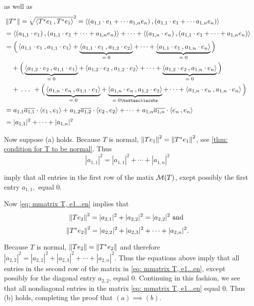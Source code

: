 \begin{prf}
  as well as
  \[
  \begin{aligned}
    & \norm{T^*} = \sqrt{\ip{T^*e_1}{T^*e_1}}^2
    = \ip{(a_{1,1}\cdot e_1 + \cdots a_{1,n} e_n)}{(a_{1,1}\cdot e_1 + \cdots a_{1,n} e_n)} \\
    & = \ip{(a_{1,1}\cdot e_1)}{(a_{1,1}\cdot e_1 + \cdots + a_{1,n} e_n)} + \cdots + \ip{(a_{1,n}\cdot e_n)}{(a_{1,1}\cdot e_1 + \cdots +a_{1,n} e_n)} \\
    & = \Big( \ip{a_{1,1} \cdot e_1}{a_{1,1}\cdot e_1} + \underbrace{\ip{a_{1,1} \cdot e_1}{a_{1,2}\cdot e_2}}_{= \; 0} + \cdots + \underbrace{\ip{a_{1,1} \cdot e_1}{a_{1,n}\cdot e_n}}_{= \; 0} \Big) \\
    & \phantom { = } \; +
    \Big( \underbrace{\ip{a_{1,2} \cdot e_2}{a_{1,1}\cdot e_1}}_{= \; 0} + \ip{a_{1,2} \cdot e_2}{a_{1,2}\cdot e_2} + \cdots + \underbrace{\ip{a_{1,2} \cdot e_2}{a_{1,n}\cdot e_n}}_{= \; 0} \Big) \\
    & \phantom { = } \; + \mathlarger{\ddd} +
    \Big( \underbrace{\ip{a_{1,n} \cdot e_n}{a_{1,1}\cdot e_1}}_{= \; 0} + \underbrace{\ip{a_{1,n} \cdot e_n}{a_{1,2}\cdot e_2}}_{= \; 0´} + \cdots + \ip{a_{1,n} \cdot e_n}{a_{1,n}\cdot e_n} \Big) \\
    & = a_{1,1} \overline{a_{1,1}} \cdot  \ip{e_1}{e_1} + a_{1,2} \overline{a_{1,2}} \cdot  \ip{e_2}{e_2} + \cdots + a_{1,n} \overline{a_{1,n}} \cdot  \ip{e_n}{e_n} \\
    & = |a_{1,1}|^2 + \cdots + |a_{1,n}|^2
  \end{aligned}
  \]

   Now suppose (a) holds. Because $T$ is normal, $\left \lVert T e_1 \right \rVert^2 = \left \lVert T^* e_1 \right \rVert^2$, see \ref{thm: condition for T to be normal}. Thus
  \[
  |a_{1,1}|^2 = |a_{1,1}|^2 + \cdots + |a_{1,n}|^2
  \]

  imply that all entries in the first row of the matix $\mathcal{M}(T)$, exept possibly the first entry $a_{1,1},$ equal $0$.

  Now \eqref{eq: mmatrix T, e1...en} implies that
  \[
  \norm{Te_2}^2 = |a_{2,1}|^2 + |a_{2,2}|^2 = |a_{2,2}|^2 $ and $
  \]
  \[
  \left \lVert T^* e_2 \right \rVert^2 = |a_{2,2}|^2 + |a_{2,3}|^2 + \cdots + |a_{2,n}|^2.
  \]

  Because $T$ is normal, $\left \lVert T e_2 \right \rVert = \left \lVert T^* e_2 \right \rVert$ and therefore $|a_{2,2}|^2=|a_{2,2}|^2 + |a_{2,3}|^2 + \cdots + |a_{2,n}|^2$. Thus the equations above imply that all entries in the second row of the matrix in \eqref{eq: mmatrix T, e1...en}, except possibly for the diagonal entry $a_{2,2}$, equal $0$. Continuing in this fashion, we see that all nondiagonal entries in the matrix \eqref{eq: mmatrix T, e1...en} equal $0$. Thus (b) holds, completing the proof that $(a) \implies (b)$.


\end{prf}
